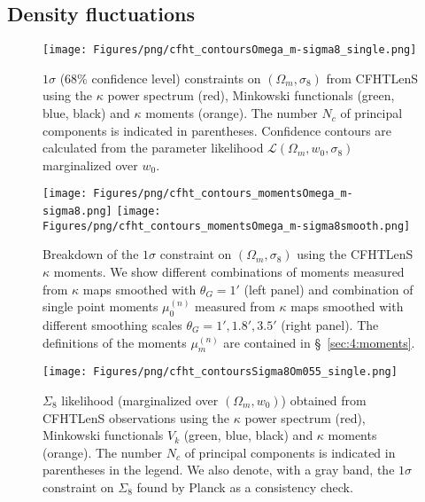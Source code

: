 \subsection{Density fluctuations}
\label{sec:6:omsi8}
%
\begin{figure}
\begin{center}
\texttt{[image: Figures/png/cfht\_contoursOmega\_m-sigma8\_single.png]}
\end{center}
\caption{$1\sigma$ (68\% confidence level) constraints on $(\Omega_m,\sigma_8)$ from CFHTLenS using the $\kappa$ power spectrum (red), Minkowski functionals (green, blue, black) and $\kappa$ moments (orange). The number $N_c$ of principal components is indicated in parentheses. Confidence contours are calculated from the parameter likelihood $\mathcal{L}(\Omega_m,w_0,\sigma_8)$ marginalized over $w_0$.}
\label{fig:6:cOmSisingle}
\end{figure}
%
\begin{figure}
\begin{center}
\texttt{[image: Figures/png/cfht\_contours\_momentsOmega\_m-sigma8.png]} \texttt{[image: Figures/png/cfht\_contours\_momentsOmega\_m-sigma8smooth.png]}
\end{center}
\caption{Breakdown of the $1\sigma$ constraint on $(\Omega_m,\sigma_8)$ using the CFHTLenS $\kappa$ moments. We show different combinations of moments measured from $\kappa$ maps smoothed with $\theta_G=1'$ (left panel) and combination of single point moments $\mu_0^{(n)}$ measured from $\kappa$ maps smoothed with different smoothing scales $\theta_G=1',1.8',3.5'$ (right panel). The definitions of the moments $\mu_m^{(n)}$ are contained in \S~\ref{sec:4:moments}.}
\label{fig:6:cOmSimoments}
\end{figure}
%
\begin{figure}
\begin{center}
\texttt{[image: Figures/png/cfht\_contoursSigma8Om055\_single.png]}
\end{center}
\caption{$\Sigma_8$ likelihood (marginalized over $(\Omega_m,w_0)$) obtained from CFHTLenS observations using the $\kappa$ power spectrum (red), Minkowski functionals $V_k$ (green, blue, black) and $\kappa$ moments (orange). The number $N_c$ of principal components is indicated in parentheses in the legend. We also denote, with a gray band, the $1\sigma$ constraint on $\Sigma_8$ found by Planck \citep{Planck15} as a consistency check.}
\label{fig:6:cSi855}
\end{figure}
%
